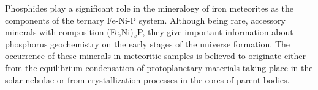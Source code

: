 \documentclass[twoside,twocolumn,9pt]{article}
\begin{document}
Phosphides play a significant role in the mineralogy of iron meteorites as the components of the ternary Fe-Ni-P system. 
Although being rare, accessory minerals  with  composition  (Fe,Ni)$_x$P, they give important information about phosphorus geochemistry on the early stages of the universe formation. \cite{Skala2005, skala_m-2003, Buseck1969, Britvin-2002, Pratesi-2006, reed_1968, Britvin2019-SciRep, Britvin2019-PCM-Fe2P, Britvin2019-murashkoite-MP-FeP, Britvin2020-Halamishite}
The occurrence  of  these  minerals  in  meteoritic  samples  is  believed  to originate either from the equilibrium condensation of protoplanetary materials  taking  place in the solar nebulae  or  from  crystallization processes  in  the  cores  of  parent  bodies. 

\end{document}

